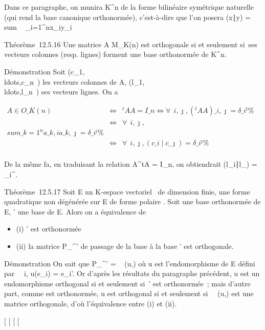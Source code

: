 \documentclass[]{article}
\begin{document}
Dans ce paragraphe, on munira K^n de la forme bilinéaire
symétrique naturelle (qui rend la base canonique orthonormée),
c'est-à-dire que l'on posera (x∣y)
= \\sum ~
\_i=1^nx\_iy\_i

Théorème~12.5.16 Une matrice A \in M\_K(n) est orthogonale si et
seulement si~ses vecteurs colonnes (resp. lignes) forment une base
orthonormée de K^n.

Démonstration Soit
(c\_1,\\ldots,c\_n~)
les vecteurs colonnes de A,
(l\_1,\\ldots,l\_n~)
ses vecteurs lignes. On a

\begin{align*} A \in O\_K(n)&
\Leftrightarrow & ^tAA = I\_ n
\Leftrightarrow \forall~~i,\jmath,
(^tAA)\_ i,\jmath = \delta\_i^\jmath\%&
\\ & \Leftrightarrow &
\forall~~i,\jmath, \\sum
\_k=1^na\_ k,ia\_k,\jmath =
\delta\_i^\jmath \%& \\ &
\Leftrightarrow & \forall~~i,\jmath,
(c\_i∣c\_\jmath) =
\delta\_i^\jmath \%& \\
\end{align*}

De la même fa\ccon, en traduisant la relation
A^tA = I\_n, on obtiendrait
(l\_i∣l\_\jmath) =
\delta\_i^\jmath.

Théorème~12.5.17 Soit E un K-espace vectoriel ~de dimension finie, \Phi une
forme quadratique non dégénérée sur E de forme polaire \phi. Soit  une
base orthonormée de E, ' une base de E. Alors on a équivalence de

\begin{itemize}
\itemsep1pt\parskip0pt
\item
  (i) ' est orthonormée
\item
  (ii) la matrice P\_^' de passage de la base  à la
  base ' est orthogonale.
\end{itemize}

Démonstration On sait que P\_^'
= \mathrmMat~ (u,) où u est
l'endomorphisme de E défini par \forall~~i,
u(e\_i) = e\_i'. Or d'après les résultats du paragraphe
précédent, u est un endomorphisme orthogonal si et seulement si~' est
orthonormée~; mais d'autre part, comme  est orthonormée, u est
orthogonal si et seulement
si~\mathrmMat~ (u,) est une
matrice orthogonale, d'où l'équivalence entre (i) et (ii).

{[}
{[}
{[}
{[}
\end{document}
